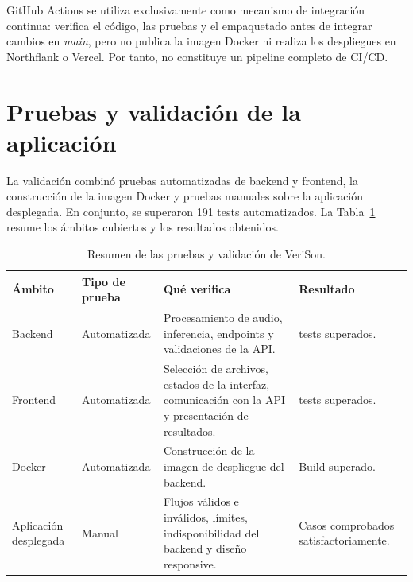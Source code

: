 GitHub Actions se utiliza exclusivamente como mecanismo de integración continua: verifica el código, las pruebas y el empaquetado antes de integrar cambios en \textit{main}, pero no publica la imagen Docker ni realiza los despliegues en Northflank o Vercel. Por tanto, no constituye un pipeline completo de CI/CD.

\section{Pruebas y validación de la aplicación}

La validación combinó pruebas automatizadas de backend y frontend, la construcción de la imagen Docker y pruebas manuales sobre la aplicación desplegada. En conjunto, se superaron 191 tests automatizados. La Tabla~\ref{tab:pruebas-validacion-aplicacion} resume los ámbitos cubiertos y los resultados obtenidos.

\begin{table}[H]
    \centering
    \caption{Resumen de las pruebas y validación de VeriSon.}
    \label{tab:pruebas-validacion-aplicacion}
    \begin{tabularx}{\textwidth}{
        >{\raggedright\arraybackslash}p{}
        >{\raggedright\arraybackslash}p{}
        >{\raggedright\arraybackslash}X
        >{\raggedright\arraybackslash}p{}
    }
        \toprule
        \textbf{Ámbito} & \textbf{Tipo de prueba} & \textbf{Qué verifica} & \textbf{Resultado} \\
        \midrule
        Backend & Automatizada & Procesamiento de audio, inferencia, endpoints y validaciones de la API. & 162 tests superados. \\
        Frontend & Automatizada & Selección de archivos, estados de la interfaz, comunicación con la API y presentación de resultados. & 29 tests superados. \\
        Docker & Automatizada & Construcción de la imagen de despliegue del backend. & Build superado. \\
        Aplicación desplegada & Manual & Flujos válidos e inválidos, límites, indisponibilidad del backend y diseño responsive. & Casos comprobados satisfactoriamente. \\
        \bottomrule
    \end{tabularx}
\end{table}
